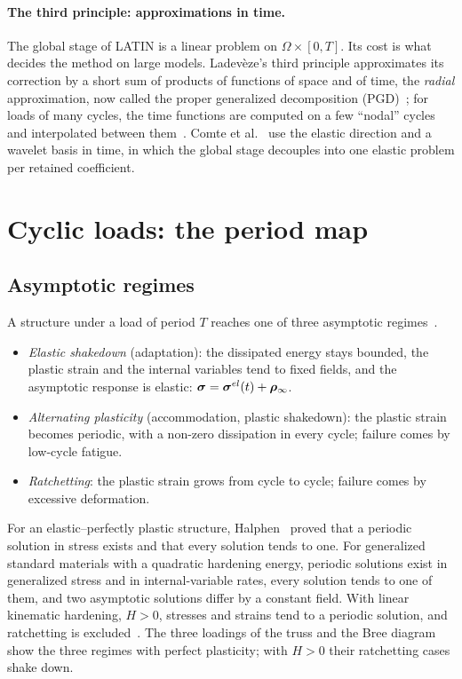 \paragraph{The third principle: approximations in time.}
%
The global stage of LATIN is a linear problem on $\Omega\times[0,T]$. Its cost
is what decides the method on large models. Ladev\`eze's third principle
approximates its correction by a short sum of products of functions of space
and of time, the \emph{radial} approximation, now called the proper
generalized decomposition (PGD)~\cite{LadevezeNCSM,NeronLadeveze2010}; for
loads of many cycles, the time functions are computed on a few ``nodal''
cycles and interpolated between them~\cite{CognardLadeveze1993}. Comte et
al.~\cite{ComteEtAl2006} use the elastic direction and a wavelet basis in
time, in which the global stage decouples into one elastic problem per
retained coefficient.

\section{Cyclic loads: the period map}\label{sec:cy-period}
%
\subsection{Asymptotic regimes}
A structure under a load of period $T$ reaches one of three asymptotic
regimes~\cite[Sec.~4.2]{Maitournam2012c}.
%
\begin{itemize}
  \item \emph{Elastic shakedown} (adaptation): the dissipated energy stays
  bounded, the plastic strain and the internal variables tend to fixed
  fields, and the asymptotic response is elastic: $\bm{\sigma}=\bm{\sigma}^{el}(t)+\bm{\rho}_\infty$.
  \item \emph{Alternating plasticity} (accommodation, plastic shakedown): the
  plastic strain becomes periodic, with a non-zero dissipation in every
  cycle; failure comes by low-cycle fatigue.
  \item \emph{Ratchetting}: the plastic strain grows from cycle to cycle;
  failure comes by excessive deformation.
\end{itemize}
For an elastic--perfectly plastic structure, Halphen~\cite{Halphen1978} proved
that a periodic solution in stress exists and that every solution tends to one.
For generalized standard materials with a quadratic hardening energy,
periodic solutions exist in generalized stress and in internal-variable rates,
every solution tends to one of them, and two asymptotic solutions differ by a
constant field. With linear kinematic hardening, $H>0$, stresses and strains
tend to a periodic solution, and ratchetting is
excluded~\cite[Sec.~4.2]{Maitournam2012c}. The three loadings of the truss and
the Bree diagram show the three regimes with perfect plasticity; with $H>0$
their ratchetting cases shake down.

